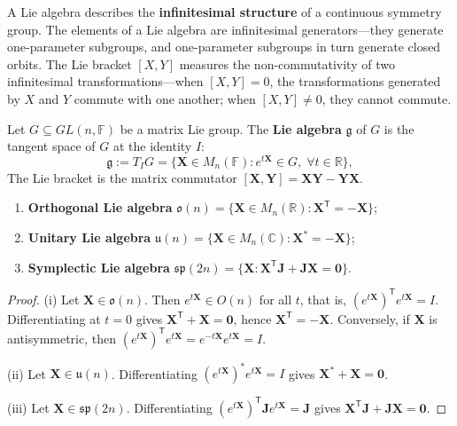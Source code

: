 \begin{remark}\label{rem:lie_algebra_periodic_meaning}
A Lie algebra describes the \textbf{infinitesimal structure} of a continuous symmetry group. The elements of a Lie algebra are infinitesimal generators---they generate one-parameter subgroups, and one-parameter subgroups in turn generate closed orbits. The Lie bracket $[X,Y]$ measures the non-commutativity of two infinitesimal transformations---when $[X,Y] = 0$, the transformations generated by $X$ and $Y$ commute with one another; when $[X,Y] \neq 0$, they cannot commute.
\end{remark}

\begin{definition}\label{def:matrix_lie_algebra}
Let $G \subseteq GL(n, \mathbb{F})$ be a matrix Lie group. The \textbf{Lie algebra} $\mathfrak{g}$ of $G$ is the tangent space of $G$ at the identity $I$:
\[
\mathfrak{g} := T_I G = \{\mathbf{X} \in M_n(\mathbb{F}) : e^{t\mathbf{X}} \in G, \; \forall t \in \mathbb{R}\},
\]
The Lie bracket is the matrix commutator $[\mathbf{X}, \mathbf{Y}] = \mathbf{XY} - \mathbf{YX}$.
\end{definition}

\begin{proposition}\label{prop:three_matrix_lie_algebras}
\begin{enumerate}[label=(\roman*)]
    \item \textbf{Orthogonal Lie algebra} $\mathfrak{o}(n) = \{\mathbf{X} \in M_n(\mathbb{R}) : \mathbf{X}^{\mathsf T} = -\mathbf{X}\}$;
    \item \textbf{Unitary Lie algebra} $\mathfrak{u}(n) = \{\mathbf{X} \in M_n(\mathbb{C}) : \mathbf{X}^* = -\mathbf{X}\}$;
    \item \textbf{Symplectic Lie algebra} $\mathfrak{sp}(2n) = \{\mathbf{X} : \mathbf{X}^{\mathsf T}\mathbf{J} + \mathbf{J}\mathbf{X} = \mathbf{0}\}$.
\end{enumerate}
\end{proposition}

\begin{proof}
(i) Let $\mathbf{X} \in \mathfrak{o}(n)$. Then $e^{t\mathbf{X}} \in O(n)$ for all $t$, that is, $(e^{t\mathbf{X}})^{\mathsf T} e^{t\mathbf{X}} = I$. Differentiating at $t = 0$ gives $\mathbf{X}^{\mathsf T} + \mathbf{X} = \mathbf{0}$, hence $\mathbf{X}^{\mathsf T} = -\mathbf{X}$. Conversely, if $\mathbf{X}$ is antisymmetric, then $(e^{t\mathbf{X}})^{\mathsf T} e^{t\mathbf{X}} = e^{-t\mathbf{X}} e^{t\mathbf{X}} = I$.

(ii) Let $\mathbf{X} \in \mathfrak{u}(n)$. Differentiating $(e^{t\mathbf{X}})^* e^{t\mathbf{X}} = I$ gives $\mathbf{X}^* + \mathbf{X} = \mathbf{0}$.

(iii) Let $\mathbf{X} \in \mathfrak{sp}(2n)$. Differentiating $(e^{t\mathbf{X}})^{\mathsf T} \mathbf{J} e^{t\mathbf{X}} = \mathbf{J}$ gives $\mathbf{X}^{\mathsf T}\mathbf{J} + \mathbf{J}\mathbf{X} = \mathbf{0}$.
\end{proof}

